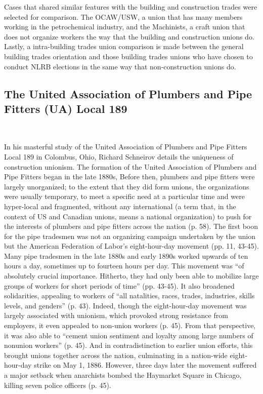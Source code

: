 Cases that shared similar features with the building and construction trades were selected for comparison. The OCAW/USW, a union that has many members working in the petrochemical industry, and the Machinists, a craft union that does not organize workers the way that the building and construction unions do. Lastly, a intra-building trades union comparison is made between the general building trades orientation and those building trades unions who have chosen to conduct NLRB elections in the same way that non-construction unions do.

\subsection{The United Association of Plumbers and Pipe Fitters (UA) Local 189} \

In his masterful study of the United Association of Plumbers and Pipe Fitters Local 189 in Colombus, Ohio, Richard Schneirov details the uniqueness of construction unionism. The formation of the United Association of Plumbers and Pipe Fitters began in the late 1880s, Before then, plumbers and pipe fitters were largely unorganized; to the extent that they did form unions, the organizations were usually temporary, to meet a specific need at a particular time and were hyper-local and fragmented, without any international (a term that, in the context of US and Canadian unions, means a national organization) to push for the interests of plumbers and pipe fitters across the nation (p. 58). The first boon for the pipe tradesmen was not an organizing campaign undertaken by the union but the American Federation of Labor’s eight-hour-day movement (pp. 11, 43-45). Many pipe tradesmen in the late 1880s and early 1890s worked upwards of ten hours a day, sometimes up to fourteen hours per day. This movement was “of absolutely crucial importance. Hitherto, they had only been able to mobilize large groups of workers for short periods of time” (pp. 43-45). It also broadened solidarities, appealing to workers of “all natalities, races, trades, industries, skills levels, and genders” (p. 43). Indeed, though the eight-hour-day movement was largely associated with unionism, which provoked strong resistance from employers, it even appealed to non-union workers (p. 45). From that perspective, it was also able to “cement union sentiment and loyalty among large numbers of nonunion workers” (p. 45). And in contradistinction to earlier union efforts, this brought unions together across the nation, culminating in a nation-wide eight-hour-day strike on May 1, 1886. However, three days later the movement suffered a major setback when anarchists bombed the Haymarket Square in Chicago, killing seven police officers (p. 45).

